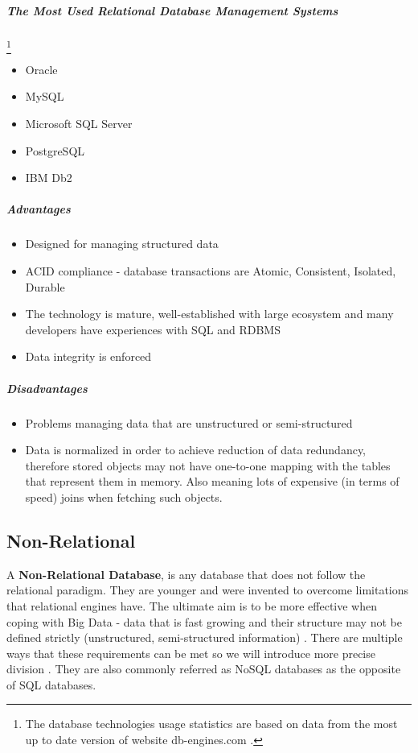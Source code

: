 \subparagraph{The Most Used Relational Database Management Systems} \footnote{The database technologies usage statistics are based on data from the most up to date version of website db-engines.com \cite{DatabaseEnginesStatistics19}.}

\begin{itemize}
	\item Oracle
	\item MySQL
	\item Microsoft SQL Server
	\item PostgreSQL
	\item IBM Db2
\end{itemize}

\subparagraph{Advantages}
\cite{RelationalVsNonRelationalDatabases1} \cite{RelationalVsNonRelationalDatabases2}

\begin{itemize}
	\item Designed for managing structured data
	\item ACID compliance - database transactions are Atomic, Consistent, Isolated, Durable
	\item The technology is mature, well-established with large ecosystem and many developers have experiences with SQL and RDBMS
	\item Data integrity is enforced
\end{itemize}

\subparagraph{Disadvantages}

\begin{itemize}
	\item Problems managing data that are unstructured or semi-structured
	\item Data is normalized in order to achieve reduction of data redundancy, therefore stored objects may not have one-to-one mapping with the tables that represent them in memory. Also meaning lots of expensive (in terms of speed) joins when fetching such objects.
\end{itemize}

\subsection{Non-Relational}
A \textbf{Non-Relational Database}, is any database that does not follow the relational paradigm. They are younger and were invented to overcome limitations that relational engines have. 
The ultimate aim is to be more effective when coping with Big Data - data that is fast growing and their structure may not be defined strictly (unstructured, semi-structured information) \cite{NonRelationalDBs}.
There are multiple ways that these requirements can be met so we will introduce more precise division \cite{DatabaseTypes}.
They are also commonly referred as NoSQL databases as the opposite of SQL databases.


